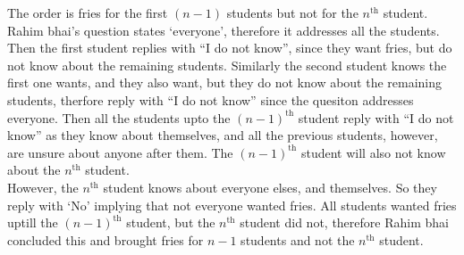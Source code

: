 \documentclass[a4paper]{exam}
\begin{document}
\begin{questions}
\begin{solution}
    The order is fries for the first $(n-1)$ students but not for the $n^{\text{th}}$ student. Rahim bhai's question states `everyone', therefore it addresses all the students. Then the first student replies with ``I do not know'', since they want fries, but do not know about the remaining students. Similarly the second student knows the first one wants, and they also want, but they do not know about the remaining students, therfore reply with ``I do not know'' since the quesiton addresses everyone. Then all the students upto the $ (n - 1)^{\text{th}} $ student reply with ``I do not know'' as they know about themselves, and all the previous students, however, are unsure about anyone after them. The $ (n-1)^{\text{th}} $ student will also not know about the $ n^{\text{th}} $ student. \\ 
    However, the $ n^{\text{th}} $ student knows about everyone elses, and themselves. So they reply with `No' implying that not everyone wanted fries. All students wanted fries uptill the $ (n-1)^{\text{th}} $ student, but the $ n^{\text{th}} $ student did not, therefore Rahim bhai concluded this and brought fries for $ n-1 $ students and not the $ n^{\text{th}} $ student.
  \end{solution}

  
\end{questions}
\end{document}
